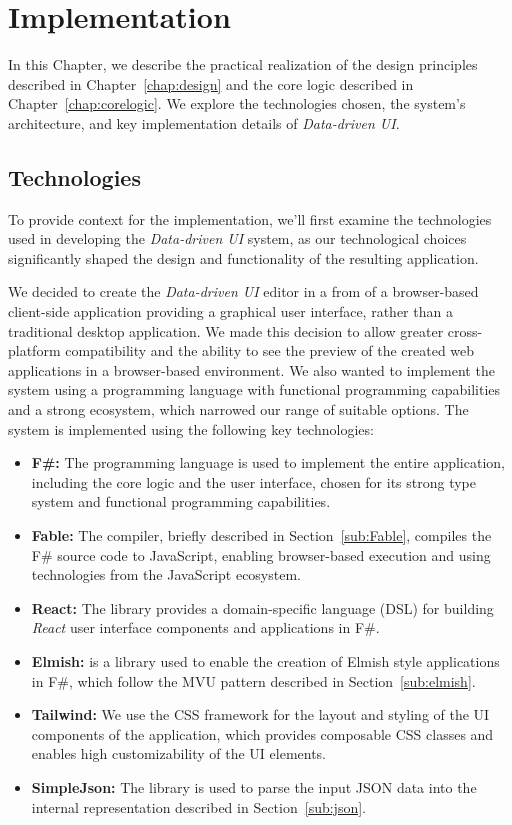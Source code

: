 \chapter{Implementation}
\label{chap:implementation}

In this Chapter, we describe the practical realization of the design principles described in Chapter~\ref{chap:design} and the core logic described in Chapter~\ref{chap:corelogic}.
We explore the technologies chosen, the system's architecture, and key implementation details of \emph{Data-driven UI}.


\section{Technologies}
\label{sec:technologies}
To provide context for the implementation, we'll first examine the technologies used in developing the \emph{Data-driven UI} system, as our technological choices significantly shaped the design and functionality of the resulting application.

We decided to create the \emph{Data-driven UI} editor in a from of a browser-based client-side application providing a graphical user interface, rather than a traditional desktop application.
We made this decision to allow greater cross-platform compatibility and the ability to see the preview of the created web applications in a browser-based environment.
We also wanted to implement the system using a programming language with functional programming capabilities and a strong ecosystem, which narrowed our range of suitable options.
The system is implemented using the following key technologies:
\begin{itemize}
	\item \textbf{F\#:} The \citet{fsharp} programming language is used to implement the entire application, including the core logic and the user interface, chosen for its strong type system and functional programming capabilities.
	\item \textbf{Fable:} The \citet{fable} compiler, briefly described in Section~\ref{sub:Fable}, compiles the F\# source code to JavaScript, enabling browser-based execution and using technologies from the JavaScript ecosystem.
	\item \textbf{React:} The \citet{feliz} library provides a domain-specific language (DSL) for building \emph{React} user interface components and applications in F\#.
	\item \textbf{Elmish:} \citet{elmish} is a library used to enable the creation of Elmish style applications in F\#, which follow the MVU pattern described in Section~\ref{sub:elmish}.
	\item \textbf{Tailwind:} We use the \citet{tailwind} CSS framework for the layout and styling of the UI components of the application, which provides composable CSS classes and enables high customizability of the UI elements.
	\item \textbf{SimpleJson:} The \citet{simpleJson} library is used to parse the input JSON data into the internal representation described in Section~\ref{sub:json}.
\end{itemize}


